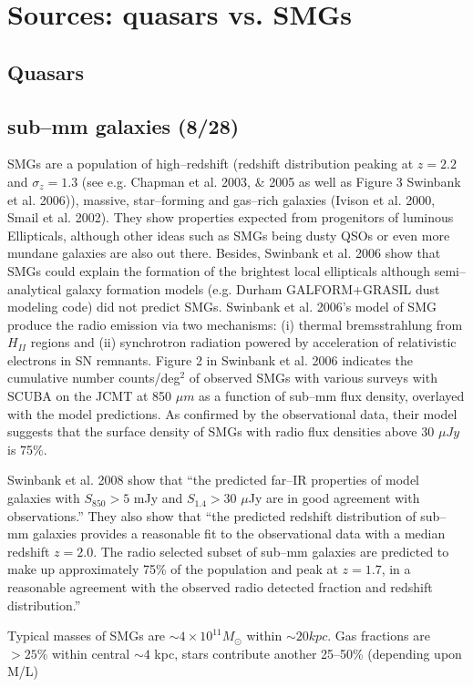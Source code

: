 \documentclass[paper=a4, fontsize=11pt]{scrartcl} %
\numberwithin{equation}{section} %
\numberwithin{figure}{section} %
\numberwithin{table}{section} %
\begin{document}
\newpage
\section{Sources: quasars vs. SMGs}

\subsection{Quasars}

\subsection{sub--mm galaxies (8/28)}
SMGs are a population of high--redshift (redshift distribution peaking at $z = 2.2$ and $\sigma_z = 1.3$ (see e.g. Chapman et al. 2003, \& 2005 as well as Figure 3 Swinbank et al. 2006)), massive, star--forming and gas--rich galaxies (Ivison et al. 2000, Smail et al. 2002). They show properties expected from progenitors of luminous Ellipticals, although other ideas such as SMGs being dusty QSOs or even more mundane galaxies are also out there. Besides, Swinbank et al. 2006 show that SMGs could explain the formation of the brightest local ellipticals although semi--analytical galaxy formation models (e.g. Durham GALFORM+GRASIL dust modeling code) did not predict SMGs. Swinbank et al. 2006's model of SMG produce the radio emission via two mechanisms: (i) thermal bremsstrahlung from $H_{II}$ regions and (ii) synchrotron radiation powered by acceleration of relativistic electrons in SN remnants. Figure 2 in Swinbank et al. 2006 indicates the cumulative number counts/deg$^2$ of observed SMGs with various surveys with SCUBA on the JCMT at 850 $\mu m$ as a function of sub--mm flux density, overlayed with the model predictions. As confirmed by the observational data, their model suggests that the surface density of SMGs with radio flux densities above 30 $\mu Jy$ is 75\%.

Swinbank et al. 2008 show that ``the predicted far--IR properties of model galaxies with $S_{850} > 5$ mJy and $S_{1.4} > 30$ $\mu$Jy are in good agreement with observations.'' They also show that ``the predicted redshift distribution of sub--mm galaxies provides a reasonable fit to the observational data with a median redshift $z=2.0$. The radio selected subset of sub--mm galaxies are predicted to make up approximately 75\% of the population and peak at $z=1.7$, in a reasonable agreement with the observed radio detected fraction and redshift distribution.''

Typical masses of SMGs are $\sim 4\times10^{11} M_\odot$ within $\sim 20 kpc$. Gas fractions are $>25\%$ within central $\sim 4$ kpc, stars contribute another 25--50\% (depending upon M/L)
\end{document}
